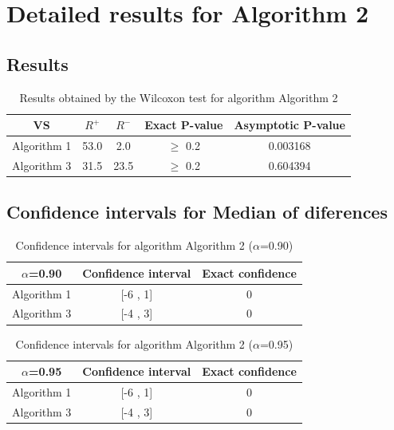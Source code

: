 \documentclass[a4paper,10pt]{article}
\begin{document}
 \clearpage 


\section{Detailed results for Algorithm 2}


\subsection{Results}

\begin{table}[!htp]
\centering\small
\begin{tabular}{
|c|c|c|c|c|}
\hline
 VS & $R^{+}$ & $R^{-}$ & Exact P-value & Asymptotic P-value \\ \hline 
Algorithm 1 & 53.0 & 2.0 & $\geq$ 0.2 & 0.003168\\ \hline 
Algorithm 3 & 31.5 & 23.5 & $\geq$ 0.2 & 0.604394\\ \hline 

\end{tabular}
\caption{Results obtained by the Wilcoxon test for algorithm Algorithm 2}
\end{table}

\subsection{Confidence intervals for Median of diferences}

\begin{table}[!htp]
\centering\small
\begin{tabular}{
|c|c|c|}
\hline
 $\alpha$=0.90 & Confidence interval & Exact confidence \\ \hline 
Algorithm 1 & [-6 , 1] & 0\\ \hline 
Algorithm 3 & [-4 , 3] & 0\\ \hline 

\end{tabular}
\caption{Confidence intervals for algorithm Algorithm 2 ($\alpha$=0.90)}
\end{table}
\begin{table}[!htp]
\centering\small
\begin{tabular}{
|c|c|c|}
\hline
 $\alpha$=0.95 & Confidence interval & Exact confidence \\ \hline 
Algorithm 1 & [-6 , 1] & 0\\ \hline 
Algorithm 3 & [-4 , 3] & 0\\ \hline 

\end{tabular}
\caption{Confidence intervals for algorithm Algorithm 2 ($\alpha$=0.95)}
\end{table}
\end{document}
